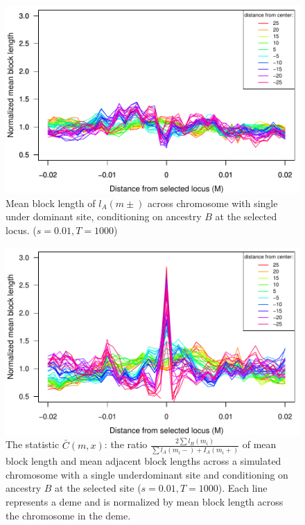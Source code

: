 \begin{figure}
\includegraphics{figs/adjacentBlocksAlongChromAncBConditioning.pdf}
\caption{Mean block length of $l_A(m\pm)$ across chromosome with single under dominant site, conditioning on ancestry $B$ at the selected locus. ($s=0.01, T=1000$)}\label{Supp:adjacentBlocks}
\end{figure}


\begin{figure}
\includegraphics{figs/ratioAdjacentBlocksAlongChromAncBConditioning.pdf}
    \caption{The statistic $\bar C(m,x)$: the ratio $\frac{2\sum{l_B(m_i)}}{\sum{l_A(m_i-)+I_A(m_i+)}}$ of mean block length and mean adjacent block lengths across a simulated chromosome with a single underdominant site and conditioning on ancestry $B$ at the selected site ($s=0.01, T=1000$).  Each line represents a deme and is normalized by mean block length across the chromosome in the deme.}\label{Supp:ratioBlockAdjacent}
\end{figure}


